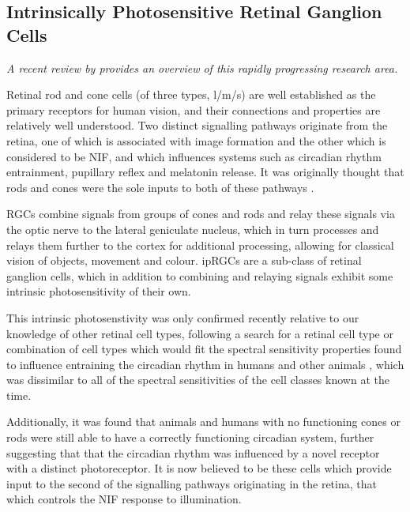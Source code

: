 \subsection{Intrinsically Photosensitive Retinal Ganglion Cells}

\textit{A recent review by \citet{spitschan_melanopsin_2019} provides an overview of this rapidly progressing research area.}

\bigskip

Retinal rod and cone cells (of three types, l/m/s) are well established as the primary receptors for human vision, and their connections and properties are relatively well understood. Two distinct signalling pathways originate from the retina, one of which is associated with image formation and the other which is considered to be \gls{NIF}, and which influences systems such as circadian rhythm entrainment, pupillary reflex and melatonin release. It was originally thought that rods and cones were the sole inputs to both of these pathways \citep{hankins_melanopsin_2008}.

\Glspl{RGC} combine signals from groups of cones and rods and relay these signals via the optic nerve to the lateral geniculate nucleus, which in turn processes and relays them further to the cortex for additional processing, allowing for classical vision of objects, movement and colour. \Glspl{ipRGC} are a sub-class of retinal ganglion cells, which in addition to combining and relaying signals exhibit some intrinsic photosensitivity of their own. %

This intrinsic photosenstivity was only confirmed recently \citep{qiu_induction_2005} relative to our knowledge of other retinal cell types, following a search for a retinal cell type or combination of cell types which would fit the spectral sensitivity properties found to influence entraining the circadian rhythm in humans and other animals \citep{brainard_human_2001,brainard_action_2001}, which was dissimilar to all of the spectral sensitivities of the cell classes known at the time.

Additionally, it was found that animals and humans with no functioning cones or rods were still able to have a correctly functioning circadian system\citep{freedman_regulation_1999,zaidi_short-wavelength_2007}, further suggesting that that the circadian rhythm was influenced by a novel receptor with a distinct photoreceptor. It is now believed to be these cells which provide input to the second of the signalling pathways originating in the retina, that which controls the \gls{NIF} response to illumination.

